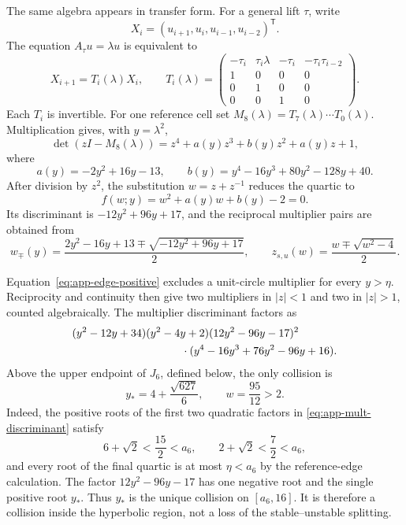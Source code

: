 The same algebra appears in transfer form.  For a general lift \(\tau\),
write
\[
 X_i=(u_{i+1},u_i,u_{i-1},u_{i-2})^{\mathsf T}.
\]
The equation \(A_\tau u=\lambda u\) is equivalent to
\begin{equation}
 X_{i+1}=T_i(\lambda)X_i,
 \qquad
 T_i(\lambda)=
 \begin{pmatrix}
 -\tau_i&\tau_i\lambda&-\tau_i&-\tau_i\tau_{i-2}\\
 1&0&0&0\\0&1&0&0\\0&0&1&0
 \end{pmatrix}.                       \label{eq:app-step-transfer}
\end{equation}
Each \(T_i\) is invertible.  For one reference cell set
\(M_8(\lambda)=T_7(\lambda)\cdots T_0(\lambda)\). Multiplication
gives, with \(y=\lambda^2\),
\begin{equation}
 \det(zI-M_8(\lambda))
 =z^4+a(y)z^3+b(y)z^2+a(y)z+1,         \label{eq:app-palindromic}
\end{equation}
where
\begin{equation}
 a(y)=-2y^2+16y-13,\qquad
 b(y)=y^4-16y^3+80y^2-128y+40.         \label{eq:app-ab}
\end{equation}
After division by \(z^2\), the substitution \(w=z+z^{-1}\) reduces the
quartic to
\begin{equation}
 f(w;y)=w^2+a(y)w+b(y)-2=0.             \label{eq:app-w-quadratic}
\end{equation}
Its discriminant is \(-12y^2+96y+17\), and the reciprocal multiplier pairs
are obtained from
\begin{equation}
 w_\mp(y)=\frac{2y^2-16y+13
 \mp\sqrt{-12y^2+96y+17}}2,\qquad
 z_{s,u}(w)=\frac{w\mp\sqrt{w^2-4}}2.  \label{eq:app-multipliers}
\end{equation}

Equation~\eqref{eq:app-edge-positive} excludes a unit-circle multiplier for
every \(y>\eta\).  Reciprocity and continuity then give two multipliers in
\(|z|<1\) and two in \(|z|>1\), counted algebraically. The
multiplier discriminant factors as
\begin{align}
 &(y^2-12y+34)(y^2-4y+2)(12y^2-96y-17)^2 \notag\\
 &\hspace{35mm}{}\cdot
 (y^4-16y^3+76y^2-96y+16).              \label{eq:app-mult-discriminant}
\end{align}
Above the upper endpoint of \(J_6\), defined below, the only collision is
\begin{equation}
 y_*=4+\frac{\sqrt{627}}6,\qquad w=\frac{95}{12}>2.  \label{eq:app-repeat}
\end{equation}
Indeed, the positive roots of the first two quadratic factors in
\eqref{eq:app-mult-discriminant} satisfy
\[
6+\sqrt2<\frac{15}{2}<a_6,\qquad
2+\sqrt2<\frac72<a_6,
\]
and every root of the final quartic is at most \(\eta<a_6\) by the
reference-edge calculation.  The factor \(12y^2-96y-17\) has one negative
root and the single positive root \(y_*\). Thus \(y_*\) is the unique
collision on
\([a_6,16]\).
It is therefore a collision inside the hyperbolic region, not a loss of the
stable--unstable splitting.

